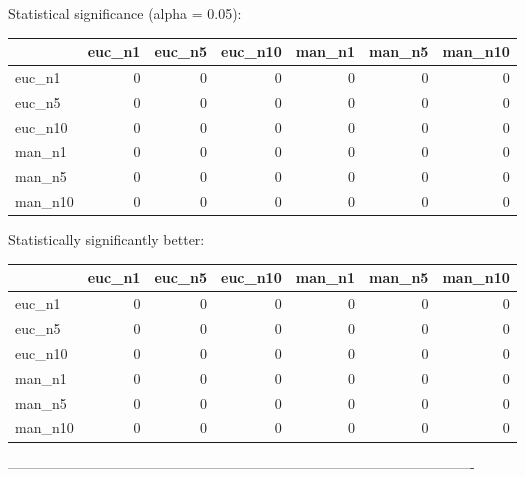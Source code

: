 Statistical significance (alpha = 0.05):
 \begin{tabular}{lrrrrrr}
\hline
         &   euc\_n1 &   euc\_n5 &   euc\_n10 &   man\_n1 &   man\_n5 &   man\_n10 \\
\hline
 euc\_n1  &        0 &        0 &         0 &        0 &        0 &         0 \\
 euc\_n5  &        0 &        0 &         0 &        0 &        0 &         0 \\
 euc\_n10 &        0 &        0 &         0 &        0 &        0 &         0 \\
 man\_n1  &        0 &        0 &         0 &        0 &        0 &         0 \\
 man\_n5  &        0 &        0 &         0 &        0 &        0 &         0 \\
 man\_n10 &        0 &        0 &         0 &        0 &        0 &         0 \\
\hline
\end{tabular} 

Statistically significantly better:
 \begin{tabular}{lrrrrrr}
\hline
         &   euc\_n1 &   euc\_n5 &   euc\_n10 &   man\_n1 &   man\_n5 &   man\_n10 \\
\hline
 euc\_n1  &        0 &        0 &         0 &        0 &        0 &         0 \\
 euc\_n5  &        0 &        0 &         0 &        0 &        0 &         0 \\
 euc\_n10 &        0 &        0 &         0 &        0 &        0 &         0 \\
 man\_n1  &        0 &        0 &         0 &        0 &        0 &         0 \\
 man\_n5  &        0 &        0 &         0 &        0 &        0 &         0 \\
 man\_n10 &        0 &        0 &         0 &        0 &        0 &         0 \\
\hline
\end{tabular} 

----------------------------------------------------------------------------------------------------



